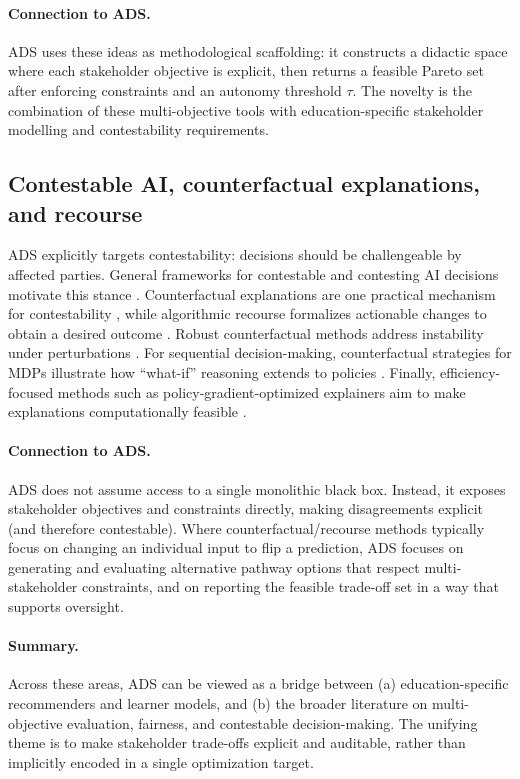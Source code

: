 \documentclass{article}
\begin{document}
\paragraph{Connection to ADS.}
ADS uses these ideas as methodological scaffolding: it constructs a didactic space where each stakeholder objective is explicit, then returns a feasible Pareto set after enforcing constraints and an autonomy threshold $\tau$.
The novelty is the combination of these multi-objective tools with education-specific stakeholder modelling and contestability requirements.

\subsection{Contestable AI, counterfactual explanations, and recourse}
\label{sec:rw-contestable}

ADS explicitly targets contestability: decisions should be challengeable by affected parties.
General frameworks for contestable and contesting AI decisions motivate this stance \cite{aler2020contestable,alfrink2023contestable,dignum2025contesting}.
Counterfactual explanations are one practical mechanism for contestability \cite{wachter2017counterfactual}, while algorithmic recourse formalizes actionable changes to obtain a desired outcome \cite{ustun2019recourse}.
Robust counterfactual methods address instability under perturbations \cite{robustx2025}.
For sequential decision-making, counterfactual strategies for MDPs illustrate how ``what-if'' reasoning extends to policies \cite{cfmdp2025}.
Finally, efficiency-focused methods such as policy-gradient-optimized explainers aim to make explanations computationally feasible \cite{pan2025fex}.

\paragraph{Connection to ADS.}
ADS does not assume access to a single monolithic black box.
Instead, it exposes stakeholder objectives and constraints directly, making disagreements explicit (and therefore contestable).
Where counterfactual/recourse methods typically focus on changing an individual input to flip a prediction, ADS focuses on generating and evaluating alternative pathway options that respect multi-stakeholder constraints, and on reporting the feasible trade-off set in a way that supports oversight.

\paragraph{Summary.}
Across these areas, ADS can be viewed as a bridge between (a) education-specific recommenders and learner models, and (b) the broader literature on multi-objective evaluation, fairness, and contestable decision-making.
The unifying theme is to make stakeholder trade-offs explicit and auditable, rather than implicitly encoded in a single optimization target.



\end{document}
